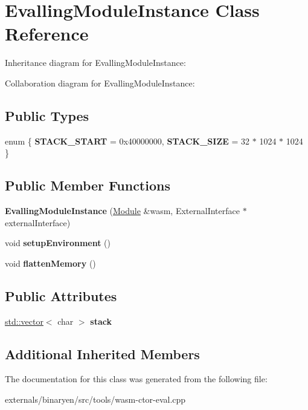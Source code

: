 \hypertarget{class_evalling_module_instance}{}\section{Evalling\+Module\+Instance Class Reference}
\label{class_evalling_module_instance}


Inheritance diagram for Evalling\+Module\+Instance\+:


Collaboration diagram for Evalling\+Module\+Instance\+:
\subsection*{Public Types}
\begin{DoxyCompactItemize}
\item 
\mbox{\label{class_evalling_module_instance_a214dce4a68d4d44a1a0b9b58a4e6a4d6}} 
enum \{ {\bfseries S\+T\+A\+C\+K\+\_\+\+S\+T\+A\+RT} = 0x40000000, 
{\bfseries S\+T\+A\+C\+K\+\_\+\+S\+I\+ZE} = 32 $\ast$ 1024 $\ast$ 1024
 \}
\end{DoxyCompactItemize}
\subsection*{Public Member Functions}
\begin{DoxyCompactItemize}
\item 
\mbox{\label{class_evalling_module_instance_a15ea168e5e68469b45598f6b5443ed11}} 
{\bfseries Evalling\+Module\+Instance} (\mbox{\hyperlink{classwasm_1_1_module}{Module}} \&wasm, External\+Interface $\ast$external\+Interface)
\item 
\mbox{\label{class_evalling_module_instance_a2e6dcb1149ccbf23acea422b06610c75}} 
void {\bfseries setup\+Environment} ()
\item 
\mbox{\label{class_evalling_module_instance_a9df81270b08401c76a698fa37b4fd94e}} 
void {\bfseries flatten\+Memory} ()
\end{DoxyCompactItemize}
\subsection*{Public Attributes}
\begin{DoxyCompactItemize}
\item 
\mbox{\label{class_evalling_module_instance_a1b38833821bc1de2a5149853523cd0c9}} 
\mbox{\hyperlink{classstd_1_1vector}{std\+::vector}}$<$ char $>$ {\bfseries stack}
\end{DoxyCompactItemize}
\subsection*{Additional Inherited Members}


The documentation for this class was generated from the following file\+:\begin{DoxyCompactItemize}
\item 
externals/binaryen/src/tools/wasm-\/ctor-\/eval.\+cpp\end{DoxyCompactItemize}
